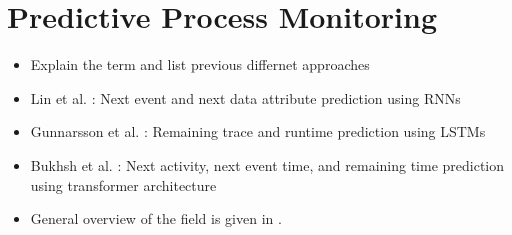 \section{Predictive Process Monitoring}


\begin{itemize}
    \item Explain the term and list previous differnet approaches
    \item Lin et al. \cite{predictive-process-monitoring-rnn}: Next event and next data attribute prediction using RNNs
    \item Gunnarsson et al. \cite{predictive-process-monitoring-lstm}: Remaining trace and runtime prediction using LSTMs
    \item Bukhsh et al. \cite{predictive-process-monitoring-transformer}: Next activity, next event time, and remaining time prediction using transformer architecture
    \item General overview of the field is given in \cite{predictive-process-monitoring}.
\end{itemize}